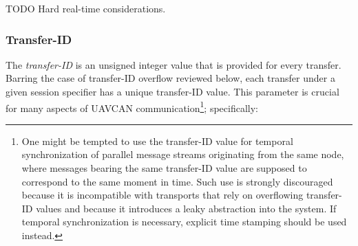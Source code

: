 TODO Hard real-time considerations.

\subsubsection{Transfer-ID}\label{sec:transport_transfer_id}

The \emph{transfer-ID} is an unsigned integer value that is provided for every transfer.
Barring the case of transfer-ID overflow reviewed below,
each transfer under a given session specifier has a unique transfer-ID value.
This parameter is crucial for many aspects of UAVCAN communication\footnote{%
    One might be tempted to use the transfer-ID value for temporal synchronization of
    parallel message streams originating from the same node,
    where messages bearing the same transfer-ID value are supposed to correspond to the same moment in time.
    Such use is strongly discouraged because it is incompatible with transports that rely on overflowing
    transfer-ID values and because it introduces a leaky abstraction into the system.
    If temporal synchronization is necessary, explicit time stamping should be used instead.
}; specifically:

